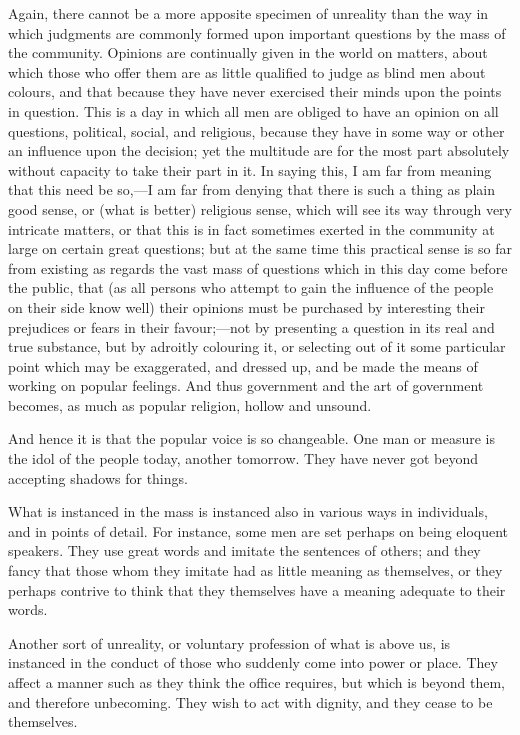Again, there cannot be a more apposite specimen of unreality than
the way in which judgments are commonly formed upon important
questions by the mass of the community. Opinions are continually given
in the world on matters, about which those who offer them are as
little qualified to judge as blind men about colours, and that because
they have never exercised their minds upon the points in question.
This is a day in which all men are obliged to have an opinion on all
questions, political, social, and religious, because they have in some
way or other an influence upon the decision; yet the multitude are for
the most part absolutely without capacity to take their part in it. In
saying this, I am far from meaning that this need be so,—I am far
from denying that there is such a thing as plain good sense, or (what
is better) religious sense, which will see its way through very
intricate matters, or that this is in fact sometimes exerted in the
community at large on certain great questions; but at the same time
this practical sense is so far from existing as regards the vast mass
of questions which in this day come before the public, that (as all
persons who attempt to gain the influence of the people on their side
know well) their opinions must be purchased by interesting their
prejudices or fears in their favour;—not by presenting a question in
its real and true substance, but by adroitly colouring it, or
selecting out of it some particular point which may be exaggerated,
and dressed up, and be made the means of working on popular feelings.
And thus government and the art of government becomes, as much as
popular religion, hollow and unsound.

And hence it is that the popular voice is so changeable. One man or
measure is the idol of the people today, another tomorrow. They have
never got beyond accepting shadows for things.

What is instanced in the mass is instanced also in various ways in
individuals, and in points of detail. For instance, some men are set
perhaps on being eloquent speakers. They use great words and imitate
the sentences of others; and they fancy that those whom they imitate
had as little meaning as themselves, or they perhaps contrive to think
that they themselves have a meaning adequate to their words.

Another sort of unreality, or voluntary profession of what is above
us, is instanced in the conduct of those who suddenly come into power
or place. They affect a manner such as they think the office requires,
but which is beyond them, and therefore unbecoming. They wish to act
with dignity, and they cease to be themselves.

